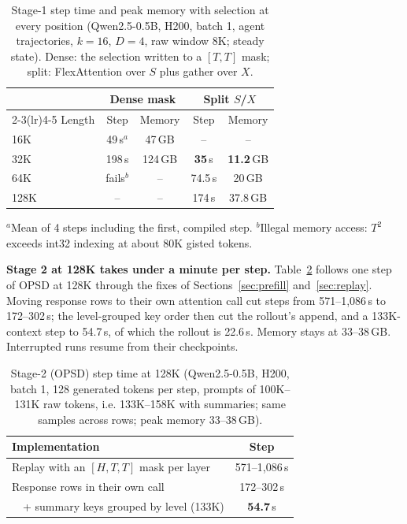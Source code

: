 \documentclass[10pt,twocolumn]{article}
\newcommand{\para}[1]{\noindent\textbf{#1}\hspace{0.5em}}
\begin{document}
\begin{table}[t]
\caption{Stage-1 step time and peak memory with selection at every position (Qwen2.5-0.5B,
H200, batch 1, agent trajectories, $k=16$, $D=4$, raw window 8K; steady state). Dense: the
selection written to a $[T,T]$ mask; split: FlexAttention over $S$ plus gather over $X$.}
\label{tab:stage1}
\centering\small
\begin{tabular}{lcccc}
\toprule
& \multicolumn{2}{c}{Dense mask} & \multicolumn{2}{c}{Split $S$/$X$} \\
\cmidrule(lr){2-3}\cmidrule(lr){4-5}
Length & Step & Memory & Step & Memory \\
\midrule
16K  & 49\,s$^{a}$ & 47\,GB & -- & -- \\
32K  & 198\,s & 124\,GB & \textbf{35}\,s & \textbf{11.2}\,GB \\
64K  & fails$^{b}$ & -- & 74.5\,s & 20\,GB \\
128K & -- & -- & 174\,s & 37.8\,GB \\
\bottomrule
\end{tabular}

\vspace{2pt}
\raggedright\footnotesize
$^{a}$Mean of 4 steps including the first, compiled step. $^{b}$Illegal memory access: $T^2$
exceeds int32 indexing at about 80K gisted tokens.
\end{table}

\para{Stage 2 at 128K takes under a minute per step.}
Table~\ref{tab:opsd} follows one step of OPSD at 128K through the fixes of
Sections~\ref{sec:prefill} and~\ref{sec:replay}. Moving response rows to their own attention
call cut steps from 571--1,086\,s to 172--302\,s; the level-grouped key order then cut the
rollout's append, and a 133K-context step to 54.7\,s, of which the rollout is 22.6\,s. Memory
stays at 33--38\,GB. Interrupted runs resume from their checkpoints.

\begin{table}[t]
\caption{Stage-2 (OPSD) step time at 128K (Qwen2.5-0.5B, H200, batch 1, 128 generated tokens
per step, prompts of 100K--131K raw tokens, i.e. 133K--158K with summaries; same samples across
rows; peak memory 33--38\,GB).}
\label{tab:opsd}
\centering\small
\begin{tabular}{p{4.6cm}c}
\toprule
Implementation & Step \\
\midrule
Replay with an $[H,T,T]$ mask per layer & 571--1,086\,s \\
Response rows in their own call & 172--302\,s \\
\ \ + summary keys grouped by level (133K) & \textbf{54.7}\,s \\
\bottomrule
\end{tabular}
\end{table}
\end{document}
